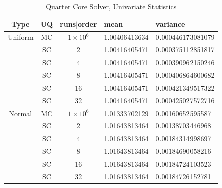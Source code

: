\begin{table}[H]
\begin{center}
\begin{tabular}{c|c c|l l}
Type & UQ & runs$|$order & mean & variance \\ \hline
Uniform &MC & $1\times10^6$ & 1.00406413634 & 0.000446173081079 \\
&SC & 2  & 1.00416405471 & 0.000375112851817 \\
&SC & 4  & 1.00416405471 & 0.000390962150246 \\
&SC & 8  & 1.00416405471 & 0.000406864600682 \\
&SC & 16 & 1.00416405471 & 0.000421349517322 \\
&SC & 32 & 1.00416405471 & 0.000425027572716 \\ \hline
Normal &MC & $1\times10^6$ & 1.01333702129 & 0.00160652595587 \\
&SC & 2  & 1.01643813464 & 0.00138703446968 \\
&SC & 4  & 1.01643813464 & 0.00184314998697 \\
&SC & 8  & 1.01643813464 & 0.00184690058216 \\
&SC & 16 & 1.01643813464 & 0.00184724103523 \\
&SC & 32 & 1.01643813464 & 0.00184726152781
\end{tabular}
\end{center}
\caption{Quarter Core Solver, Univariate Statistics}
\label{tab: 2d uni res}
\end{table}

